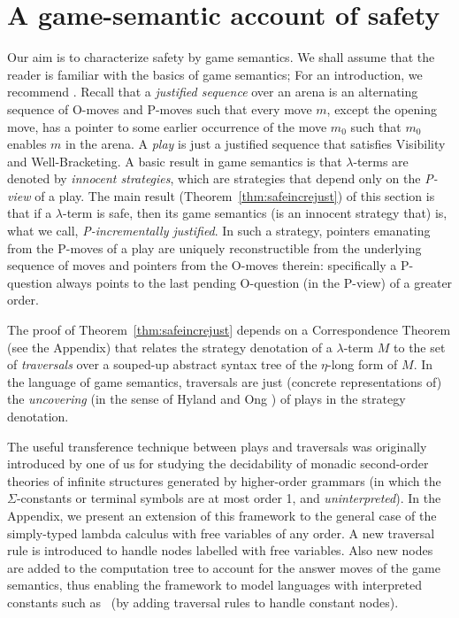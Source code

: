 
\section{A game-semantic account of safety}
\label{sec:gamesemaccount} Our aim is to characterize safety by game
semantics. We shall assume that the reader is familiar with the
basics of game semantics; For an introduction, we recommend
\cite{abramsky:game-semantics-tutorial}. Recall that a
\emph{justified sequence} over an arena is an alternating sequence
of O-moves and P-moves such that every move $m$, except the opening
move, has a pointer to some earlier occurrence of the move $m_0$
such that $m_0$ enables $m$ in the arena. A \emph{play} is just a
justified sequence that satisfies Visibility and Well-Bracketing. A
basic result in game semantics is that $\lambda$-terms are denoted
by \emph{innocent strategies}, which are strategies that depend only
on the \emph{P-view} of a play. The main result
(Theorem~\ref{thm:safeincrejust}) of this section is that if a
$\lambda$-term is safe, then its game semantics (is an innocent
strategy that) is, what we call, \emph{P-incrementally justified}. In such a
strategy, pointers emanating from the P-moves of a play are uniquely
reconstructible from the underlying sequence of moves and pointers
from the O-moves therein: specifically a P-question always points to
the last pending O-question (in the P-view) of a greater order.

The proof of Theorem~\ref{thm:safeincrejust} depends on a
Correspondence Theorem (see the Appendix) that relates the strategy
denotation of a $\lambda$-term $M$ to the set of \emph{traversals}
over a souped-up abstract syntax tree of the $\eta$-long form of $M$.
In the language of game semantics, traversals are just (concrete
representations of) the \emph{uncovering} (in the sense of Hyland
and Ong \cite{hylandong_pcf}) of plays in the strategy denotation.

The useful transference technique between plays and traversals was
originally introduced by one of us \cite{OngLics2006} for studying
the decidability of monadic second-order theories of infinite structures generated by
higher-order grammars (in which the $\Sigma$-constants or terminal symbols are at most
order 1, and \emph{uninterpreted}).
In the Appendix, we present an extension of this framework to the
general case of the simply-typed lambda calculus with free variables
of any order. A new traversal rule is introduced to handle nodes
labelled with free variables. Also new nodes are added to the
computation tree to account for the answer moves of the game
semantics, thus enabling the framework to model languages with
interpreted constants such as \pcf~(by adding traversal rules to
handle constant nodes).

